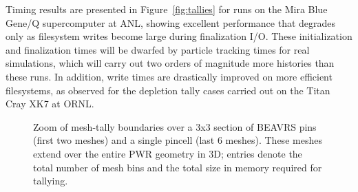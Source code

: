 \documentclass[12pt,twoside]{mitthesis-exec}
\begin{document}
Timing results are presented in Figure~\ref{fig:tallies} for runs on the Mira
Blue Gene/Q supercomputer at ANL, showing excellent performance that degrades
only as filesystem writes become large during finalization I/O. These
initialization and finalization times will be dwarfed by particle tracking times
for real simulations, which will carry out two orders of magnitude more
histories than these runs. In addition, write times are drastically improved on
more efficient filesystems, as observed for the depletion tally cases carried
out on the Titan Cray XK7 at ORNL.


\begin{figure}
    \centering
    \def\mw{3cm}
    \def\mwx{3.5cm}
    \def\mwy{5cm}
    \caption{Zoom of
    mesh-tally boundaries over a 3x3 section of BEAVRS pins (first two
    meshes) and a single pincell (last 6 meshes). These meshes extend over the
    entire PWR geometry in 3D; entries denote the total number of mesh bins and
    the total size in memory required for tallying. \label{fig:meshes}}
\end{figure}
\end{document}
